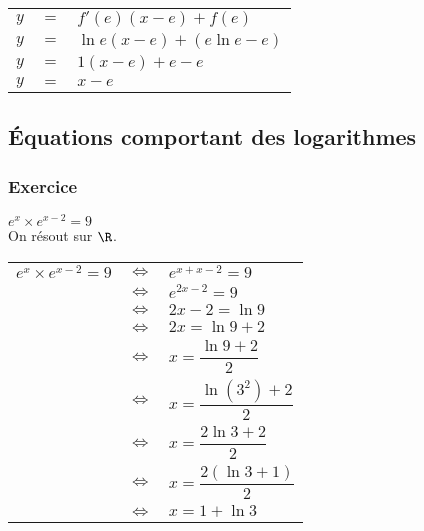 \vspace*{.3cm}

\begin{tabular}{lll}
$y$ & $=$ & $f'(e)\left(x-e\right)+ f(e)$ \vspace*{.2cm} \\
$y$ & $=$ & $ \ln e\left(x-e\right)+ \left(e\ln e - e\right)$ \vspace*{.2cm} \\
$y$ & $=$ & $1\left(x-e\right) + e - e$ \vspace*{.2cm} \\
$y$ & $=$ & $x - e$ \\
\end{tabular}

\vspace*{-5cm}

\newpage

\subsection{Équations comportant des logarithmes}

\subsubsection{Exercice }

$e^x \times e^{x-2} = 9$  \\

On résout sur $\R$. \\

\begin{tabular}{lll}
$e^x \times e^{x-2} = 9$ & $\Longleftrightarrow$ & $e^{x  + x - 2} = 9$ \vspace*{.3cm} \\
& $\Longleftrightarrow$ & $e^{2x-2} = 9$ \vspace*{.3cm} \\
& $\Longleftrightarrow$ & $2x-2 = \ln 9$ \vspace*{.3cm} \\
& $\Longleftrightarrow$ & $2x = \ln 9 + 2$ \vspace*{.3cm} \\
& $\Longleftrightarrow$ & $x = \dfrac{\ln 9 + 2}{2}$ \vspace*{.3cm} \\
& $\Longleftrightarrow$ & $x = \dfrac{\ln\left(3^2\right) + 2}{2}$ \vspace*{.3cm} \\
& $\Longleftrightarrow$ & $x = \dfrac{2\ln 3 + 2}{2}$ \vspace*{.3cm} \\
& $\Longleftrightarrow$ & $x = \dfrac{2\left(\ln 3 + 1\right)}{2}$ \vspace*{.3cm} \\
& $\Longleftrightarrow$ & $x = 1 + \ln 3$ \vspace*{.3cm} \\
\end{tabular}

